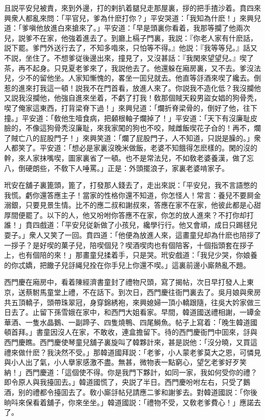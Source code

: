 且説平安兒被責，來到外邊，打的剌扒着腿兒走那屋裏，拶的把手揸沙着。賁四來興衆人都亂來問：「平官兒，爹為什麽打你？」平安哭道：「我知為什麽！」來興兒道：「爹嗔他放進白來搶來了。」平安道：「早是頭裏你看着，我那等攔了他兩次兒，説爹不在家，他強着進去了。到廳上槅子門裏，我説：『你老人家有什麽話，説下罷。爹門外送行去了，不知多喒來，只怕等不得。』他説：『我等等兒。』話又不説，坐住了。不想爹従後邊出來，撞見了，又沒甚話：『我閑來望望兒。』喫了茶，再不起身。只見夏老爹來了，我説他去了。他還躲在廂房裏，又不去。爹沒法兒，少不的留他坐。人家知慚愧的，畧坐一囬兒就去。他直等㧱酒來喫了纔去。倒惹的進來打我這一頓！説我不在門首看，放進人來了。你説我不造化低？我沒攔他又説我沒攔他，他強自進來坐着，不虧了打我！敎那個賊天殺男盜女娼的狗骨秃，喫了俺家這東西，打背梁脊下過！」來興兒道：「爛折脊梁骨的，倒好了他，往下撞。」平安道：「敎他生噎食病，把顙根軸子爛掉了！」平安道：「天下有沒廉耻皮臉的，不像這狗骨秃沒廉耻，來我家闖的狗也不咬，賊雌飯喫花子㒲的！再不，爛了賊亡八的屁股門子！」來興笑道：「爛了屁股門子，人不知道，只説是臊的。」衆人都笑了。平安道：「想必是家裏沒晚米做飯，老婆不知餓得怎麽樣的。閑的沒的幹，來人家抹嘴喫，圖家裏省了一頓。也不是常法兒，不如敎老婆養漢，做了忘八，倒硬朗些，不敎下人唾罵。」正是：外頭擺浪子，家裏老婆啃家子。

玳安在舖子裏篦頭，篦了，打發那人錢去了，走出來説：「平安兒，我不言語憋的我慌。虧你還答應主子！當家的性格你還不知道，你怎怪人！常言：養兒不要屙金溺銀，只要見景生情。比不的應二叔和謝叔來，答應在家不在家，他彼此都是心甜厚間便罷了。以下的人，他又吩咐你答應不在家，你怎的放人進來？不打你却打誰！」賁四戲道：「平安兒従新做了小孩兒，纔學行行。他又會頑，成日只踢毬兒耍子。」衆人又笑了一回。賁四道：「他便為放進人來，這畫童兒却為什麽也陪拶了一拶子？是好喫的菓子兒，陪喫個兒？喫酒喫肉也有個陪客，十個指頭套在拶子上，也有個陪的來！」那畫童兒揉着手，只是哭。玳安戲道：「我兒少哭，你娘養的你忒嬌，把饊子兒㧱䋲兒拴在你手兒上你還不喫。」這裏前邊小廝熱亂不題。

西門慶在廂房中，看着陳經濟書童封了禮物尺頭，寫了揭帖，次日早打發人上東京，送蔡駙馬童堂上禮，不在話下。到次日，西門慶往衙門裏去了。吳月娘與衆房共五頂轎子，頭帶珠翠冠，身穿錦綉袍，來興媳婦一頂小轎跟隨，往吳大妗家做三日去了。止留下孫雪娥在家中，和西門大姐看家。早間，韓道國送禮相謝，一罈金華酒、一隻水晶鵝、一副蹄子、四隻燒鴨、四尾鰣魚。帖子上寫着：「晚生韓道國頓首拜。」書童因沒人在家，不敢收，連盒擔留下。待的西門慶衙門中囬來，㧱與西門慶瞧。西門慶使琴童兒舖子裏旋叫了韓夥計來，甚是説他：「沒分曉，又買這禮來做什麽？我決然不受。」那韓道國拜説：「老爹，小人蒙老爹莫大之恩，可憐見與小人出了氣，小人擧家感激不盡。無甚，微物表一點窮心，望乞老爹好歹笑納！」西門慶道：「這個使不得。你是我門下夥計，如同一家，我如何受你的禮？即令原人與我擡囬去。」韓道國慌了，央説了半日。西門慶吩咐左右，只受了鵝酒，别的禮都令擡囬去了。敎小廝㧱帖兒請應二爹和謝爹去。對韓道國説：「你後晌呌來保看着舖子，你來坐坐。」韓道國説：「禮物不受，又敎老爹費心！」應諾去了。

